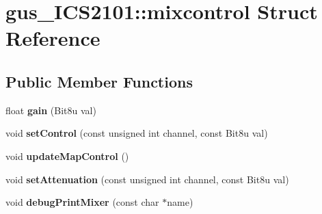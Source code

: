 \hypertarget{structgus__ICS2101_1_1mixcontrol}{\section{gus\-\_\-\-I\-C\-S2101\-:\-:mixcontrol Struct Reference}
\label{structgus__ICS2101_1_1mixcontrol}
}
\subsection*{Public Member Functions}
\begin{DoxyCompactItemize}
\item 
\hypertarget{structgus__ICS2101_1_1mixcontrol_a6165b82089b0331b01e0a10672511e78}{float {\bfseries gain} (Bit8u val)}\label{structgus__ICS2101_1_1mixcontrol_a6165b82089b0331b01e0a10672511e78}

\item 
\hypertarget{structgus__ICS2101_1_1mixcontrol_af0c1beff7697a0c2abb8b4dea0be0241}{void {\bfseries set\-Control} (const unsigned int channel, const Bit8u val)}\label{structgus__ICS2101_1_1mixcontrol_af0c1beff7697a0c2abb8b4dea0be0241}

\item 
\hypertarget{structgus__ICS2101_1_1mixcontrol_ab488ed435410b7e67c5b85876a7814c9}{void {\bfseries update\-Map\-Control} ()}\label{structgus__ICS2101_1_1mixcontrol_ab488ed435410b7e67c5b85876a7814c9}

\item 
\hypertarget{structgus__ICS2101_1_1mixcontrol_a54a63f53f8f1c4f3923b37a947dd176c}{void {\bfseries set\-Attenuation} (const unsigned int channel, const Bit8u val)}\label{structgus__ICS2101_1_1mixcontrol_a54a63f53f8f1c4f3923b37a947dd176c}

\item 
\hypertarget{structgus__ICS2101_1_1mixcontrol_a236c393f0e05478563c648427e7c0a34}{void {\bfseries debug\-Print\-Mixer} (const char $\ast$name)}\label{structgus__ICS2101_1_1mixcontrol_a236c393f0e05478563c648427e7c0a34}

\end{DoxyCompactItemize}
